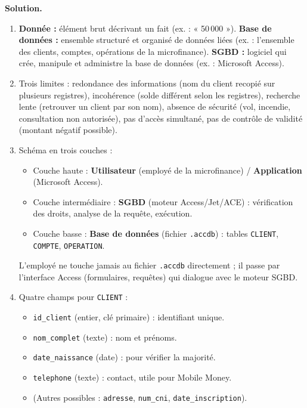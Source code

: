 \documentclass[11pt]{article}
\begin{document}
\begin{corrige}[Exercice 1]
\textbf{Solution.}
\begin{enumerate}
  \item \textbf{Donnée :} élément brut décrivant un fait (ex. : « 50\,000 »). \textbf{Base de données :} ensemble structuré et organisé de données liées (ex. : l'ensemble des clients, comptes, opérations de la microfinance). \textbf{SGBD :} logiciel qui crée, manipule et administre la base de données (ex. : Microsoft Access).
  \item Trois limites : redondance des informations (nom du client recopié sur plusieurs registres), incohérence (solde différent selon les registres), recherche lente (retrouver un client par son nom), absence de sécurité (vol, incendie, consultation non autorisée), pas d'accès simultané, pas de contrôle de validité (montant négatif possible).
  \item Schéma en trois couches :
  \begin{itemize}
    \item Couche haute : \textbf{Utilisateur} (employé de la microfinance) / \textbf{Application} (Microsoft Access).
    \item Couche intermédiaire : \textbf{SGBD} (moteur Access/Jet/ACE) : vérification des droits, analyse de la requête, exécution.
    \item Couche basse : \textbf{Base de données} (fichier \texttt{.accdb}) : tables \texttt{CLIENT}, \texttt{COMPTE}, \texttt{OPERATION}.
  \end{itemize}
  L'employé ne touche jamais au fichier \texttt{.accdb} directement ; il passe par l'interface Access (formulaires, requêtes) qui dialogue avec le moteur SGBD.
  \item Quatre champs pour \texttt{CLIENT} :
  \begin{itemize}
    \item \texttt{id\_client} (entier, clé primaire) : identifiant unique.
    \item \texttt{nom\_complet} (texte) : nom et prénoms.
    \item \texttt{date\_naissance} (date) : pour vérifier la majorité.
    \item \texttt{telephone} (texte) : contact, utile pour Mobile Money.
    \item (Autres possibles : \texttt{adresse}, \texttt{num\_cni}, \texttt{date\_inscription}).
  \end{itemize}
\end{enumerate}
\end{corrige}
\end{document}
